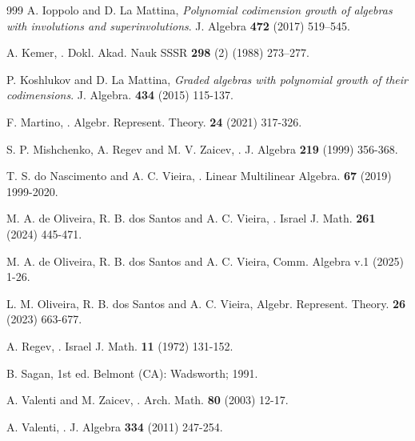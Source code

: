 \documentclass{amsart}
\numberwithin{equation}{section}
\begin{document}
\begin{thebibliography}{999}
 A. Ioppolo and D. La Mattina, \newblock 
 {\it Polynomial codimension growth of algebras with
involutions and superinvolutions}. J. Algebra {\bf 472} (2017) 519–545.






 A.  Kemer, 
\label{A.R.K}
. Dokl. Akad. Nauk SSSR {\bf 298} (2) (1988)  273–277. 

 P. Koshlukov and D. La Mattina, \textit{Graded algebras with polynomial growth of their codimensions}. J. Algebra. {\bf 434} (2015) 115-137.



 F. Martino, 
\label{F}
. Algebr. Represent. Theory. {\bf 24} (2021) 317-326.


 S. P. Mishchenko, A. Regev and M. V. Zaicev,  
\label{MRZ}
. J. Algebra {\bf 219} (1999) 356-368.  




 T. S. do Nascimento and A. C. Vieira,
\label{AT}
. Linear
Multilinear Algebra. {\bf 67} (2019) 1999-2020.

 M. A. de Oliveira, R. B. dos Santos and A. C. Vieira,
\label{Mara}
	. Israel J. Math. {\bf 261} (2024) 445-471.

  M. A. de Oliveira, R. B. dos Santos and A. C. Vieira, 
\label{OSV}
 Comm. Algebra v.1 (2025) 1-26.
		
		 L. M. Oliveira, R. B. dos Santos and A. C. Vieira,
		\newblock Algebr. Represent. Theory. {\bf 26} (2023) 663-677.

	


 A. Regev,  
\label{A.R}
. Israel J. Math. {\bf 11} (1972) 131-152.




  B. Sagan, 
\label{S}
1st ed. Belmont (CA): Wadsworth; 1991. 


  A. Valenti and M. Zaicev, 
\label{VZ}
. 
Arch. Math. {\bf 80} (2003) 12-17. 

  A. Valenti, 
\label{V}
. 
J. Algebra {\bf 334} (2011) 247-254. 



\end{thebibliography}
\end{document}
